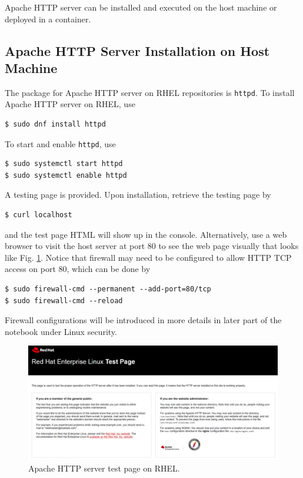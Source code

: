 Apache HTTP server can be installed and executed on the host machine or deployed in a container.

\subsection{Apache HTTP Server Installation on Host Machine}

The package for Apache HTTP server on RHEL repositories is \verb|httpd|. To install Apache HTTP server on RHEL, use
\begin{lstlisting}
$ sudo dnf install httpd
\end{lstlisting}

To start and enable \verb|httpd|, use
\begin{lstlisting}
$ sudo systemctl start httpd
$ sudo systemctl enable httpd
\end{lstlisting}

A testing page is provided. Upon installation, retrieve the testing page by
\begin{lstlisting}
$ curl localhost
\end{lstlisting}
and the test page HTML will show up in the console. Alternatively, use a web browser to visit the host server at port $80$ to see the web page visually that looks like Fig. \ref{ch:vac:fig:httpdtestpage}. Notice that firewall may need to be configured to allow HTTP TCP access on port $80$, which can be done by
\begin{lstlisting}
$ sudo firewall-cmd --permanent --add-port=80/tcp
$ sudo firewall-cmd --reload
\end{lstlisting}
Firewall configurations will be introduced in more details in later part of the notebook under Linux security.

\begin{figure}[htbp]
	\centering
	\includegraphics[width=350pt]{chapters/part-3/figures/httpdtestpage.png}
	\caption{Apache HTTP server test page on RHEL.} \label{ch:vac:fig:httpdtestpage}
\end{figure}

